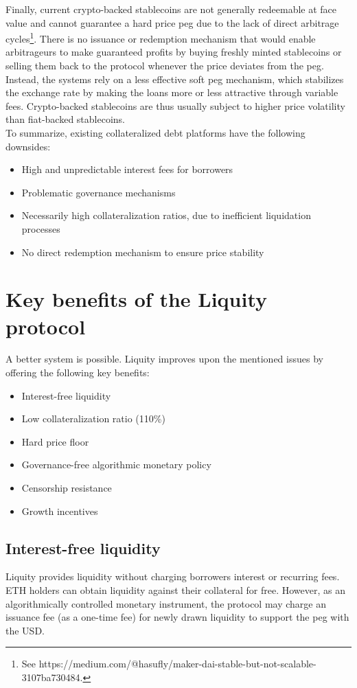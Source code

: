 \documentclass{article}
\begin{document}
Finally, current crypto-backed stablecoins are not generally redeemable at face value and cannot guarantee a hard price peg due to the lack of direct arbitrage cycles\footnote{See https://medium.com/@hasufly/maker-dai-stable-but-not-scalable-3107ba730484.}. There is no issuance or redemption mechanism that would enable arbitrageurs to make guaranteed profits by buying freshly minted stablecoins or selling them back to the protocol whenever the price deviates from the peg. Instead, the systems rely on a less effective soft peg mechanism, which stabilizes the exchange rate by making the loans more or less attractive through variable fees. Crypto-backed stablecoins are thus usually subject to higher price volatility than fiat-backed stablecoins.\\

To summarize, existing collateralized debt platforms have the following downsides:
\begin{itemize}
    \item High and unpredictable interest fees for borrowers
    \item Problematic governance mechanisms
    \item Necessarily high collateralization ratios, due to inefficient liquidation processes
    \item No direct redemption mechanism to ensure price stability
\end{itemize}
 
\section{Key benefits of the Liquity protocol}
A better system is possible. Liquity improves upon the mentioned issues by offering the following key benefits:
\begin{itemize}
    \item Interest-free liquidity
    \item Low collateralization ratio (110\%)
    \item Hard price floor
    \item Governance-free algorithmic monetary policy
    \item Censorship resistance
    \item Growth incentives
\end{itemize}

\subsection{Interest-free liquidity}
Liquity provides liquidity without charging borrowers interest or recurring fees. ETH holders can obtain liquidity against their collateral for free. However, as an algorithmically controlled monetary instrument, the protocol may charge an issuance fee (as a one-time fee) for newly drawn liquidity to support the peg with the USD.
\end{document}
